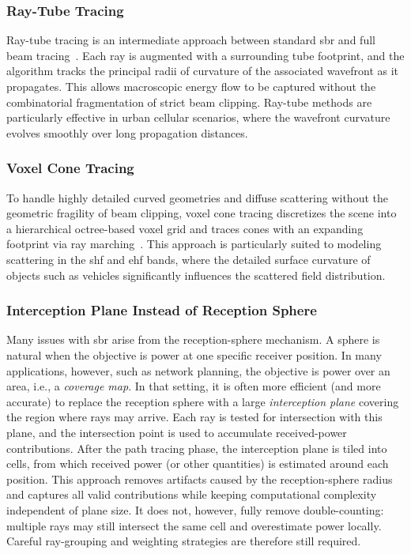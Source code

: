 \subsubsection{Ray-Tube Tracing}

Ray-tube tracing is an intermediate approach between standard \gls{sbr} and full beam tracing~. Each ray is augmented with a surrounding tube footprint, and the algorithm tracks the principal radii of curvature of the associated wavefront as it propagates. This allows macroscopic energy flow to be captured without the combinatorial fragmentation of strict beam clipping. Ray-tube methods are particularly effective in urban cellular scenarios, where the wavefront curvature evolves smoothly over long propagation distances.

\subsubsection{Voxel Cone Tracing}

To handle highly detailed curved geometries and diffuse scattering without the geometric fragility of beam clipping, voxel cone tracing discretizes the scene into a hierarchical octree-based voxel grid and traces cones with an expanding footprint via ray marching~. This approach is particularly suited to modeling scattering in the \gls{shf} and \gls{ehf} bands, where the detailed surface curvature of objects such as vehicles significantly influences the scattered field distribution.

\subsubsection{Interception Plane Instead of Reception Sphere}

Many issues with \gls{sbr} arise from the reception-sphere mechanism. A sphere is natural when the objective is power at one specific receiver position. In many applications, however, such as network planning, the objective is power over an area, i.e., a \emph{coverage map}. In that setting, it is often more efficient (and more accurate) to replace the reception sphere with a large \emph{interception plane} covering the region where rays may arrive. Each ray is tested for intersection with this plane, and the intersection point is used to accumulate received-power contributions. After the path tracing phase, the interception plane is tiled into cells, from which received power (or other quantities) is estimated around each position. This approach removes artifacts caused by the reception-sphere radius and captures all valid contributions while keeping computational complexity independent of plane size. It does not, however, fully remove double-counting: multiple rays may still intersect the same cell and overestimate power locally. Careful ray-grouping and weighting strategies are therefore still required.

